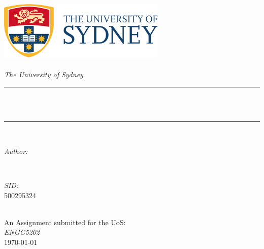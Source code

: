 \begin{titlepage}
    \newcommand{\HRule}{\rule{\linewidth}{0.5mm}}
    \includegraphics[width=8cm]{title/logo.png}\\[1cm] 
    \center 
    \quad\\[1.5cm]
    \textsl{\Large The University of Sydney}\\[0.5cm] 
    \makeatletter
    \HRule \\[0.4cm]
    { \huge \bfseries \@title}\\[0.4cm] 
    \HRule \\[1.5cm]
    \begin{minipage}{0.4\textwidth}
    \begin{flushleft} \large
    \emph{Author:}\\
    \@author 
    \end{flushleft}
    \end{minipage}
    ~
    \begin{minipage}{0.4\textwidth}
    \begin{flushright} \large
    \emph{SID:} \\
    \textup{500295324}
    \end{flushright}
    \end{minipage}\\[3cm]
    \makeatother
    {\large An Assignment submitted for the UoS:}\\[0.5cm]
    {\large \emph{ENGG5202}}\\[0.5cm]
    {\large \today}\\[2cm] 
    \vfill 
\end{titlepage}